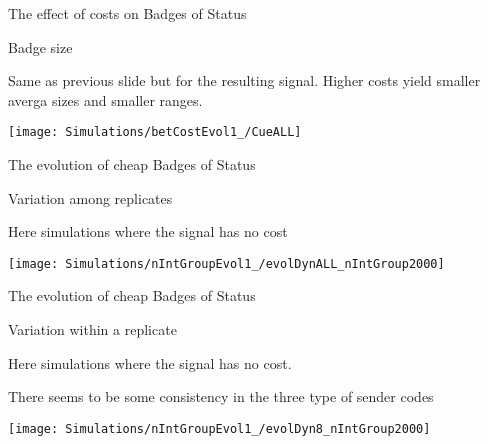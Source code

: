 \documentclass[
  ignorenonframetext,
]{beamer}
\begin{document}
\begin{frame}{The effect of costs on Badges of Status}
\protect\hypertarget{the-effect-of-costs-on-badges-of-status-1}{}

\begin{block}{Badge size}

\small

Same as previous slide but for the resulting signal. Higher costs yield
smaller averga sizes and smaller ranges.

\begin{center}\texttt{[image: Simulations/betCostEvol1\_/CueALL]} \end{center}

\end{block}

\end{frame}

\begin{frame}{The evolution of cheap Badges of Status}
\protect\hypertarget{the-evolution-of-cheap-badges-of-status}{}

\begin{block}{Variation among replicates}

\small

Here simulations where the signal has no cost

\begin{center}\texttt{[image: Simulations/nIntGroupEvol1\_/evolDynALL\_nIntGroup2000]} \end{center}

\end{block}

\end{frame}

\begin{frame}{The evolution of cheap Badges of Status}
\protect\hypertarget{the-evolution-of-cheap-badges-of-status-1}{}

\begin{block}{Variation within a replicate}

\small

Here simulations where the signal has no cost.

There seems to be some consistency in the three type of sender codes

\begin{center}\texttt{[image: Simulations/nIntGroupEvol1\_/evolDyn8\_nIntGroup2000]} \end{center}

\end{block}

\end{frame}
\end{document}
